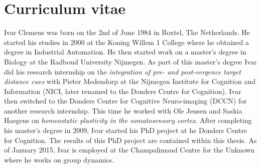 \clearpage
\pagestyle{empty}

\chapter*{Curriculum vitae}
{}

Ivar Clemens was born on the 2nd of June 1984 in Boxtel, The Netherlands. He started his studies in 2000 at the Koning Willem 1 College where he obtained a degree in Industrial Automation. He then started work on a master's degree in Biology at the Radboud University Nijmegen. As part of this master's degree Ivar did his research internship on the \emph{integration of pre- and post-vergence target distance cues} with Pieter Medendorp at the Nijmegen Institute for Cognition and Information (NICI, later renamed to the Donders Centre for Cognition). Ivar then switched to the Donders Centre for Cognitive Neuro-imaging (DCCN) for another research internship. This time he worked with Ole Jensen and Saskia Haegens on \emph{homeostatic plasticity in the somatosensory cortex}. After completing his master's degree in 2009, Ivar started his PhD project at he Donders Centre for Cognition. The results of this PhD project are contained within this thesis. As of January 2015, Ivar is employed at the Champalimaud Centre for the Unknown where he works on group dynamics.
